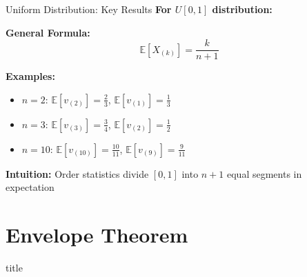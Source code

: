 \documentclass[xcolor={x11names}, aspectratio=169 ]{beamer}
\newcommand{\sectionslide}{%
  \begin{frame}
    \vfill
    \centering
    \begin{beamercolorbox}[sep=8pt,center,shadow=true,rounded=true]{title}
      \usebeamerfont{title}\insertsectionhead\par%
    \end{beamercolorbox}
    \vfill
  \end{frame}
}
\begin{document}
\begin{frame}{Uniform Distribution: Key Results}
\textbf{For $U[0,1]$ distribution:}

\vspace{0.2cm}
\textbf{General Formula:}
\[\mathbb{E}[X_{(k)}] = \frac{k}{n+1}\]

\vspace{0.3cm}
\textbf{Examples:}
\begin{itemize}
  \item $n=2$: $\mathbb{E}[v_{(2)}] = \frac{2}{3}$, $\mathbb{E}[v_{(1)}] = \frac{1}{3}$
  \item $n=3$: $\mathbb{E}[v_{(3)}] = \frac{3}{4}$, $\mathbb{E}[v_{(2)}] = \frac{1}{2}$
  \item $n=10$: $\mathbb{E}[v_{(10)}] = \frac{10}{11}$, $\mathbb{E}[v_{(9)}] = \frac{9}{11}$
\end{itemize}

\vspace{0.3cm}
\textbf{Intuition:} Order statistics divide $[0,1]$ into $n+1$ equal segments in expectation
\end{frame}

\section{Envelope Theorem}
\sectionslide
\end{document}
